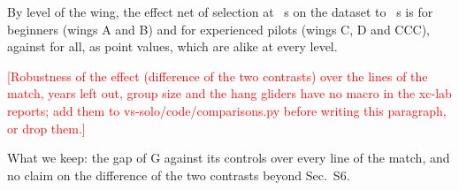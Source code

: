 \documentclass[aps,prl,twocolumn,superscriptaddress,nofootinbib]{revtex4-2}
\newcommand{\pending}[1]{\textcolor{red}{[#1]}}
\begin{document}
By level of the wing, the effect net of selection at \LtLagOne~s on the dataset to \LtTauOne~s is
\LtRouteLevelBegDiff{} for beginners (wings A and B) and \LtRouteLevelExpDiff{} for experienced pilots
(wings C, D and CCC), against \LtRouteLevelAllDiff{} for all, as point values, which are alike at every
level.

\pending{Robustness of the effect (difference of the two contrasts) over the lines of the match, years
left out, group size and the hang gliders have no macro in the xc-lab reports; add them to
vs-solo/code/comparisons.py before writing this paragraph, or drop them.}

What we keep: the gap of G against its controls over every line of the match, and no claim on the
difference of the two contrasts beyond Sec.~S6.


\end{document}
